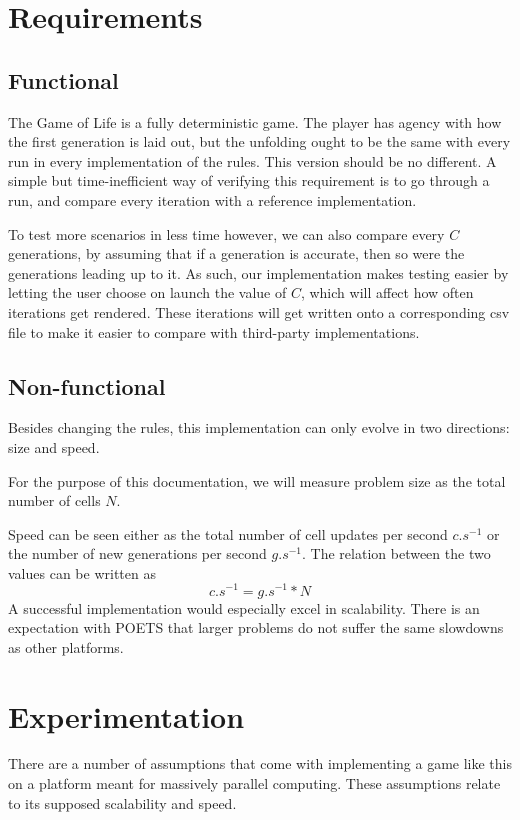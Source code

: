 \documentclass[a4paper]{article}
\begin{document}
\section*{Requirements}
\subsection*{Functional}
The Game of Life is a fully deterministic game. The player has agency with how the first generation is laid out, but the unfolding ought to be the same with every run in every implementation of the rules. This version should be no different. A simple but time-inefficient way of verifying this requirement is to go through a run, and compare every iteration with a reference implementation. 
\par To test more scenarios in less time however, we can also compare every $C$ generations, by assuming that if a generation is accurate, then so were the generations leading up to it.
As such, our implementation makes testing easier by letting the user choose on launch the value of $C$, which will affect how often iterations get rendered. These iterations will get written onto a corresponding csv file to make it easier to compare with third-party implementations.

\subsection*{Non-functional}
Besides changing the rules, this implementation can only evolve in two directions: size and speed.
\par For the purpose of this documentation, we will measure problem size as the total number of cells $N$.
\par Speed can be seen either as the total number of cell updates per second $c.s^{-1}$ or the number of new generations per second $g.s^{-1}$. The relation between the two values can be written as 
$$c.s^{-1} = g.s^{-1} * N$$ 
A successful implementation would especially excel in scalability. There is an expectation with POETS that larger problems do not suffer the same slowdowns as other platforms.

\section*{Experimentation}
There are a number of assumptions that come with implementing a game like this on a platform meant for massively parallel computing. These assumptions relate to its supposed scalability and speed.
\end{document}
